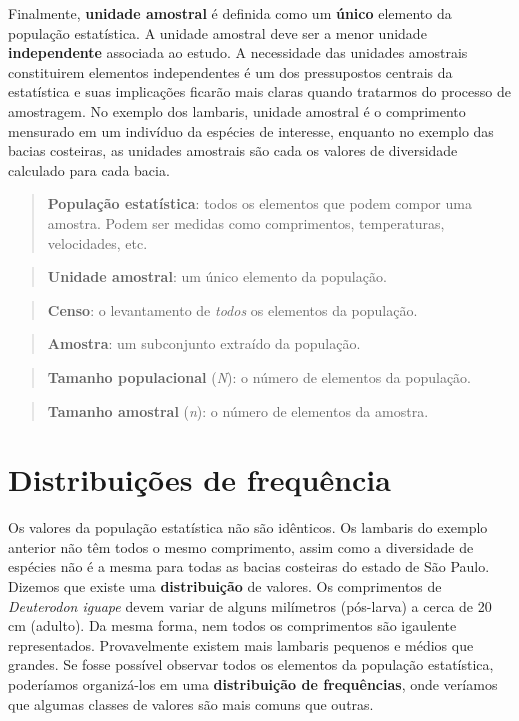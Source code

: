 \documentclass[
]{book}
\begin{document}
Finalmente, \textbf{unidade amostral} é definida como um \textbf{único} elemento da população estatística. A unidade amostral deve ser a menor unidade \textbf{independente} associada ao estudo. A necessidade das unidades amostrais constituirem elementos independentes é um dos pressupostos centrais da estatística e suas implicações ficarão mais claras quando tratarmos do processo de amostragem. No exemplo dos lambaris, unidade amostral é o comprimento mensurado em um indivíduo da espécies de interesse, enquanto no exemplo das bacias costeiras, as unidades amostrais são cada os valores de diversidade calculado para cada bacia.

\begin{quote}
\textbf{População estatística}: todos os elementos que podem compor uma amostra. Podem ser medidas como comprimentos, temperaturas, velocidades, etc.
\end{quote}

\begin{quote}
\textbf{Unidade amostral}: um único elemento da população.
\end{quote}

\begin{quote}
\textbf{Censo}: o levantamento de \emph{todos} os elementos da população.
\end{quote}

\begin{quote}
\textbf{Amostra}: um subconjunto extraído da população.
\end{quote}

\begin{quote}
\textbf{Tamanho populacional} (\emph{N}): o número de elementos da população.
\end{quote}

\begin{quote}
\textbf{Tamanho amostral} (\emph{n}): o número de elementos da amostra.
\end{quote}

\hypertarget{distribuiuxe7uxf5es-de-frequuxeancia}{%
\section{Distribuições de frequência}\label{distribuiuxe7uxf5es-de-frequuxeancia}}

Os valores da população estatística não são idênticos. Os lambaris do exemplo anterior não têm todos o mesmo comprimento, assim como a diversidade de espécies não é a mesma para todas as bacias costeiras do estado de São Paulo. Dizemos que existe uma \textbf{distribuição} de valores. Os comprimentos de \emph{Deuterodon iguape} devem variar de alguns milímetros (pós-larva) a cerca de 20 cm (adulto). Da mesma forma, nem todos os comprimentos são igaulente representados. Provavelmente existem mais lambaris pequenos e médios que grandes. Se fosse possível observar todos os elementos da população estatística, poderíamos organizá-los em uma \textbf{distribuição de frequências}, onde veríamos que algumas classes de valores são mais comuns que outras.
\end{document}
